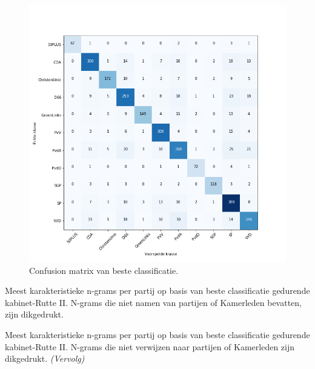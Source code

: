 \begin{figure}[H]
  \centering
    \includegraphics[width=0.60\paperwidth]{Verslag/Tables/confusionmatrix.png}
\caption{Confusion matrix van beste classificatie.}
\label{fig:confusionmatrix}
\end{figure}



\begin{table}[H]
\caption{Meest karakteristieke n-grams per partij op basis van beste classificatie gedurende kabinet-Rutte II. N-grams die niet namen van partijen of Kamerleden bevatten, zijn dikgedrukt.}
\label{tab:MostImportantWords} 
\centering
\hspace*{-1in}
 
\end{table} 
\addtocounter{table}{-1} 
\begin{table}[H]
\caption{Meest karakteristieke n-grams per partij op basis van beste classificatie gedurende kabinet-Rutte II. N-grams die niet verwijzen naar partijen of Kamerleden zijn dikgedrukt. \emph{(Vervolg)}} 
\centering
\hspace*{-1in}
 
\end{table}

